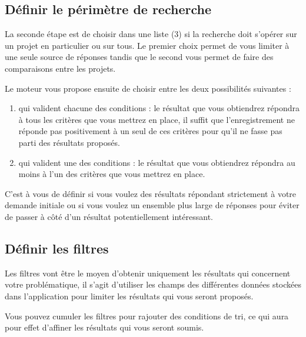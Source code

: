 \documentclass[letterpaper,10pt,french]{sphinxmanual}
\begin{document}
\subsection{Définir le périmètre de recherche}
\label{manuel/formulaire_recherche:definir-le-perimetre-de-recherche}
La seconde étape est de choisir dans une liste (3) si la recherche doit s'opérer sur un projet en particulier ou sur tous. Le premier choix permet de vous limiter à une seule source de réponses tandis que le second vous permet de faire des comparaisons entre les projets.

Le moteur vous propose ensuite de choisir entre les deux possibilités suivantes :
\begin{enumerate}
\item {} 
qui valident chacune des conditions : le résultat que vous obtiendrez répondra à tous les critères que vous mettrez en place, il suffit que l'enregistrement ne réponde pas positivement à un seul de ces critères pour qu'il ne fasse pas parti des résultats proposés.

\item {} 
qui valident une des conditions :  le résultat que vous obtiendrez répondra au moins à l'un des critères que vous mettrez en place.

\end{enumerate}

C'est à vous de définir si vous voulez des résultats répondant strictement à votre demande initiale ou si vous voulez un ensemble plus large de réponses pour éviter de passer à côté d'un résultat potentiellement intéressant.


\subsection{Définir les filtres}
\label{manuel/formulaire_recherche:definir-les-filtres}
Les filtres vont être le moyen d'obtenir uniquement les résultats qui concernent votre problématique, il s'agit d'utiliser les champs des différentes données stockées dans l'application pour limiter les résultats qui vous seront proposés.

Vous pouvez cumuler les filtres pour rajouter des conditions de tri, ce qui aura pour effet d'affiner les résultats qui vous seront soumis.
\end{document}
